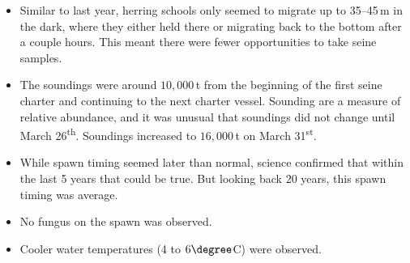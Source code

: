 \begin{itemize}
\item Similar to last year, herring schools only seemed to migrate up to 35--45\,m in the dark, where they either held there or migrating back to the bottom after a couple hours.
This meant there were fewer opportunities to take seine samples.
\item The soundings were around $10,000\,$t from the beginning of the first seine charter and continuing to the next charter vessel.
Sounding are a measure of relative abundance, and it was unusual that soundings did not change until March 26\textsuperscript{th}.
Soundings increased to $16,000\,$t on March 31\textsuperscript{st}.
\item While spawn timing seemed later than normal, science confirmed that within the last 5 years that could be true.
But looking back 20 years, this spawn timing was average.
\item No fungus on the spawn was observed.
\item Cooler water temperatures (4 to $6\degree$C) were observed.
\end{itemize}